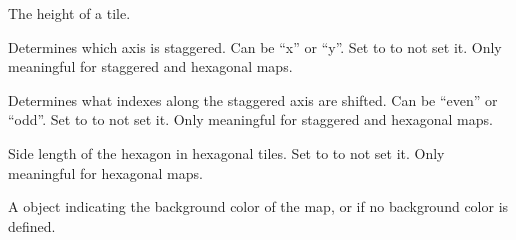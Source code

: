 \documentclass[letterpaper,10pt,english]{sphinxmanual}
\begin{document}
\begin{fulllineitems}
\begin{fulllineitems}
\end{fulllineitems}


\begin{fulllineitems}
\label{index:tmx.TileMap.tileheight}
The height of a tile.

\end{fulllineitems}


\begin{fulllineitems}
\label{index:tmx.TileMap.staggeraxis}
Determines which axis is staggered.  Can be ``x'' or ``y''.  Set to
 to not set it.  Only meaningful for staggered and
hexagonal maps.

\end{fulllineitems}


\begin{fulllineitems}
\label{index:tmx.TileMap.staggerindex}
Determines what indexes along the staggered axis are shifted.
Can be ``even'' or ``odd''.  Set to  to not set it.
Only meaningful for staggered and hexagonal maps.

\end{fulllineitems}


\begin{fulllineitems}
\label{index:tmx.TileMap.hexsidelength}
Side length of the hexagon in hexagonal tiles.  Set to
 to not set it.  Only meaningful for hexagonal maps.

\end{fulllineitems}


\begin{fulllineitems}
\label{index:tmx.TileMap.backgroundcolor}
A {\hyperref[index:tmx.Color]{\emph{}}} object indicating the background color of the
map, or  if no background color is defined.

\end{fulllineitems}


\end{fulllineitems}
\end{document}
